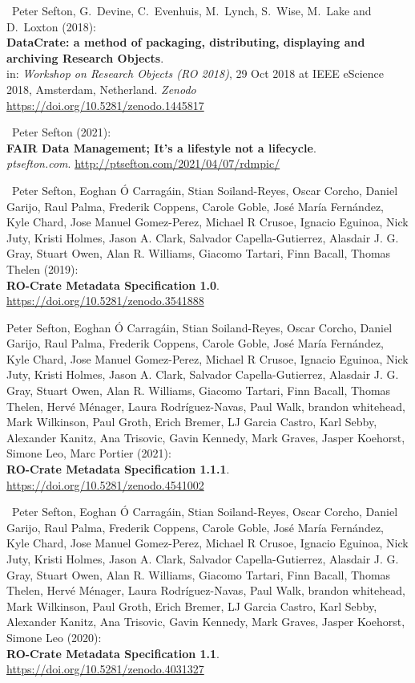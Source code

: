 \begin{thebibliography}{9}
~Peter Sefton, G.~Devine, C.~Evenhuis, M.~Lynch, S.~Wise,
M.~Lake and D.~Loxton (2018):\\
\textbf{DataCrate: a method of packaging, distributing, displaying and
archiving Research Objects}.\\
in: \emph{Workshop on Research Objects (RO 2018)}, 29 Oct 2018 at IEEE
eScience 2018, Amsterdam, Netherland. \emph{Zenodo}\\
\url{https://doi.org/10.5281/zenodo.1445817}

~Peter Sefton (2021):\\
\textbf{FAIR Data Management; It's a lifestyle not a lifecycle}.\\
\emph{ptsefton.com}. \url{http://ptsefton.com/2021/04/07/rdmpic/}

~Peter Sefton, Eoghan Ó Carragáin, Stian Soiland-Reyes, Oscar
Corcho, Daniel Garijo, Raul Palma, Frederik Coppens, Carole Goble, José
María Fernández, Kyle Chard, Jose Manuel Gomez-Perez, Michael R Crusoe,
Ignacio Eguinoa, Nick Juty, Kristi Holmes, Jason A. Clark, Salvador
Capella-Gutierrez, Alasdair J. G. Gray, Stuart Owen, Alan R. Williams,
Giacomo Tartari, Finn Bacall, Thomas Thelen (2019):\\
\textbf{RO-Crate Metadata Specification 1.0}.\\
\url{https://doi.org/10.5281/zenodo.3541888}

 Peter Sefton, Eoghan Ó Carragáin, Stian Soiland-Reyes, Oscar
Corcho, Daniel Garijo, Raul Palma, Frederik Coppens, Carole Goble, José
María Fernández, Kyle Chard, Jose Manuel Gomez-Perez, Michael R Crusoe,
Ignacio Eguinoa, Nick Juty, Kristi Holmes, Jason A. Clark, Salvador
Capella-Gutierrez, Alasdair J. G. Gray, Stuart Owen, Alan R. Williams,
Giacomo Tartari, Finn Bacall, Thomas Thelen, Hervé Ménager, Laura
Rodríguez-Navas, Paul Walk, brandon whitehead, Mark Wilkinson, Paul
Groth, Erich Bremer, LJ Garcia Castro, Karl Sebby, Alexander Kanitz, Ana
Trisovic, Gavin Kennedy, Mark Graves, Jasper Koehorst, Simone Leo, Marc
Portier (2021):\\
\textbf{RO-Crate Metadata Specification 1.1.1}.\\
\url{https://doi.org/10.5281/zenodo.4541002}

~Peter Sefton, Eoghan Ó Carragáin, Stian Soiland-Reyes, Oscar
Corcho, Daniel Garijo, Raul Palma, Frederik Coppens, Carole Goble, José
María Fernández, Kyle Chard, Jose Manuel Gomez-Perez, Michael R Crusoe,
Ignacio Eguinoa, Nick Juty, Kristi Holmes, Jason A. Clark, Salvador
Capella-Gutierrez, Alasdair J. G. Gray, Stuart Owen, Alan R. Williams,
Giacomo Tartari, Finn Bacall, Thomas Thelen, Hervé Ménager, Laura
Rodríguez-Navas, Paul Walk, brandon whitehead, Mark Wilkinson, Paul
Groth, Erich Bremer, LJ Garcia Castro, Karl Sebby, Alexander Kanitz, Ana
Trisovic, Gavin Kennedy, Mark Graves, Jasper Koehorst, Simone Leo
(2020):\\
\textbf{RO-Crate Metadata Specification 1.1}.\\
\url{https://doi.org/10.5281/zenodo.4031327}


\end{thebibliography}
